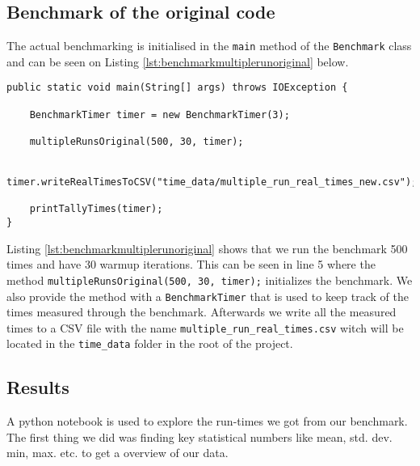 \documentclass{article}
\begin{document}
\subsection{Benchmark of the original code}
The actual benchmarking is initialised in the \lstinline{main} method of the \lstinline{Benchmark} 
class and can be seen on Listing \ref{lst:benchmarkmultiplerunoriginal} below.

\begin{lstlisting}[caption={Benchmark main method}, label={lst:benchmarkmultiplerunoriginal}]
public static void main(String[] args) throws IOException {

    BenchmarkTimer timer = new BenchmarkTimer(3);

    multipleRunsOriginal(500, 30, timer);

    timer.writeRealTimesToCSV("time_data/multiple_run_real_times_new.csv");

    printTallyTimes(timer);
}
\end{lstlisting}

Listing \ref{lst:benchmarkmultiplerunoriginal} shows that we run the benchmark 500 times and have 30 warmup iterations. 
This can be seen in line 5 where the method \lstinline{multipleRunsOriginal(500, 30, timer);} initializes the benchmark. 
We also provide the method with a \lstinline{BenchmarkTimer} that is used to keep track of the times measured through 
the benchmark. Afterwards we write all the measured times to a CSV file with the name \lstinline{multiple_run_real_times.csv}
witch will be located in the \lstinline{time_data} folder in the root of the project. 

\subsection{Results} 
A python notebook is used to explore the run-times we got from our benchmark. The first thing we did was 
finding key statistical numbers like mean, std. dev. min, max. etc. to get a overview of our data.
\end{document}
